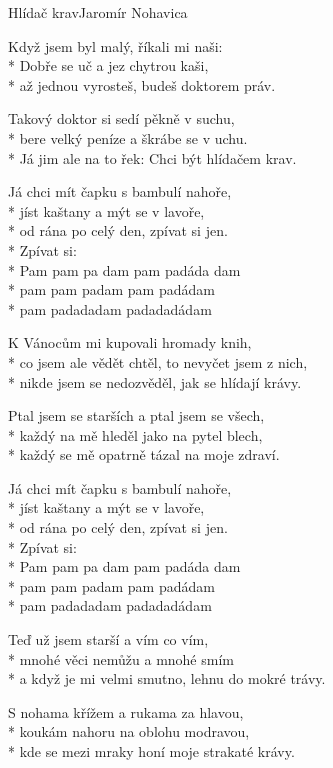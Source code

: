 \documentclass[10.5pt]{book}
\begin{document}
\begin{poem}{Hlídač krav}{Jaromír Nohavica}

\settowidth{\versewidth}{a když je mi velmi smutno, lehnu do mokré trávy.}

Když jsem byl malý, říkali mi naši:\\*
Dobře se uč a jez chytrou kaši,\\*
až jednou vyrosteš, budeš doktorem práv.

Takový doktor si sedí pěkně v suchu,\\*
bere velký peníze a škrábe se v uchu.\\*
Já jim ale na to řek: Chci být hlídačem krav.

Já chci mít čapku s bambulí nahoře,\\*
jíst kaštany a mýt se v lavoře,\\*
od rána po celý den, zpívat si jen.\\*
Zpívat si:\\*
Pam pam pa dam pam padáda dam\\*
pam pam padam pam padádam\\*
pam padadadam padadadádam

K Vánocům mi kupovali hromady knih,\\*
co jsem ale vědět chtěl, to nevyčet jsem z nich,\\*
nikde jsem se nedozvěděl, jak se hlídají krávy.

Ptal jsem se starších a ptal jsem se všech,\\*
každý na mě hleděl jako na pytel blech,\\*
každý se mě opatrně tázal na moje zdraví.

Já chci mít čapku s bambulí nahoře,\\*
jíst kaštany a mýt se v lavoře,\\*
od rána po celý den, zpívat si jen.\\*
Zpívat si:\\*
Pam pam pa dam pam padáda dam\\*
pam pam padam pam padádam\\*
pam padadadam padadadádam

Teď už jsem starší a vím co vím,\\*
mnohé věci nemůžu a mnohé smím\\*
a když je mi velmi smutno, lehnu do mokré trávy.

S nohama křížem a rukama za hlavou,\\*
koukám nahoru na oblohu modravou,\\*
kde se mezi mraky honí moje strakaté krávy.


\end{poem}
\end{document}
